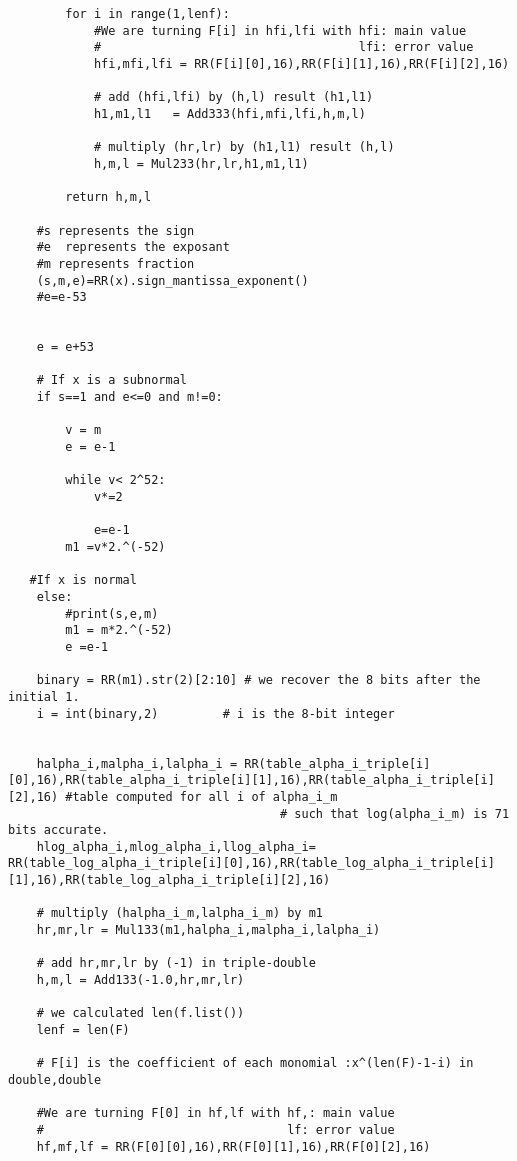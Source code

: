 \begin{lstlisting}
        for i in range(1,lenf):
            #We are turning F[i] in hfi,lfi with hfi: main value
            #                                    lfi: error value
            hfi,mfi,lfi = RR(F[i][0],16),RR(F[i][1],16),RR(F[i][2],16)

            # add (hfi,lfi) by (h,l) result (h1,l1)
            h1,m1,l1   = Add333(hfi,mfi,lfi,h,m,l)

            # multiply (hr,lr) by (h1,l1) result (h,l)
            h,m,l = Mul233(hr,lr,h1,m1,l1)
           
        return h,m,l

    #s represents the sign 
    #e  represents the exposant 
    #m represents fraction
    (s,m,e)=RR(x).sign_mantissa_exponent()
    #e=e-53 
    
    
    e = e+53
    
    # If x is a subnormal
    if s==1 and e<=0 and m!=0:
        
        v = m
        e = e-1
        
        while v< 2^52:
            v*=2
            
            e=e-1
        m1 =v*2.^(-52)
        
   #If x is normal
    else:
        #print(s,e,m)
        m1 = m*2.^(-52)
        e =e-1
    
    binary = RR(m1).str(2)[2:10] # we recover the 8 bits after the initial 1.
    i = int(binary,2)         # i is the 8-bit integer
   
    
    halpha_i,malpha_i,lalpha_i = RR(table_alpha_i_triple[i][0],16),RR(table_alpha_i_triple[i][1],16),RR(table_alpha_i_triple[i][2],16) #table computed for all i of alpha_i_m
                                      # such that log(alpha_i_m) is 71 bits accurate.
    hlog_alpha_i,mlog_alpha_i,llog_alpha_i= RR(table_log_alpha_i_triple[i][0],16),RR(table_log_alpha_i_triple[i][1],16),RR(table_log_alpha_i_triple[i][2],16)
    
    # multiply (halpha_i_m,lalpha_i_m) by m1
    hr,mr,lr = Mul133(m1,halpha_i,malpha_i,lalpha_i)
   
    # add hr,mr,lr by (-1) in triple-double
    h,m,l = Add133(-1.0,hr,mr,lr)
    
    # we calculated len(f.list())
    lenf = len(F)

    # F[i] is the coefficient of each monomial :x^(len(F)-1-i) in double,double
    
    #We are turning F[0] in hf,lf with hf,: main value
    #                                  lf: error value
    hf,mf,lf = RR(F[0][0],16),RR(F[0][1],16),RR(F[0][2],16)


\end{lstlisting}
